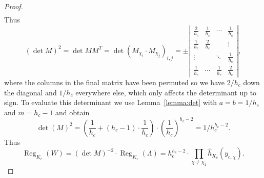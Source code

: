 \documentclass[preprint,12pt]{elsarticle}
\newcommand{\hhat}{\hat{h}}
\DeclareMathOperator{\Reg}{Reg}
\theoremstyle{plain}
\theoremstyle{definition}
\begin{document}
\begin{proof}
\begin{align*}
  \end{align*}
  Thus
  $$
  (\det M)^2 = \det MM^T = \det (M_{\chi_i} \cdot M_{\chi_j})_{i,j} =
  \pm \left|
    \begin{array}{cccc}
      \frac{2}{h_c} & \frac{1}{h_c}  & \cdots & \frac{1}{h_c}  \\
      \frac{1}{h_c} & \frac{2}{h_c}  & & \vdots  \\
      \vdots &   & \ddots & \frac{1}{h_c} \\
      \frac{1}{h_c} & \cdots & \frac{1}{h_c} & \frac{2}{h_c}
    \end{array}
  \right|,
  $$
  where the columns in the final matrix have been permuted so we have
  $2/h_c$ down the diagonal and $1/h_c$ everywhere else, which only
  affects the determinant up to sign.  To evaluate this determinant we
  use Lemma~\ref{lemma:det} with $a=b=1/h_c$ and $m=h_c-1$ and obtain
$$    \det(M)^2 = \left(\frac{1}{h_c} + (h_c-1)\cdot \frac{1}{h_c}\right) \cdot \left(\frac{1}{h_c}\right)^{h_c-2}
    = 1/h_c^{h_c-2}.
$$
  Thus
  $$
  \Reg_{K_c}(W) = (\det M)^{-2} \cdot \Reg_{K_c}(\Lambda) = h_c^{h_c-2}
  \cdot \prod_{\chi \ne \chi_1} \hhat_{K_c}(y_{c,\chi}).
  $$
\end{proof}
\end{document}
